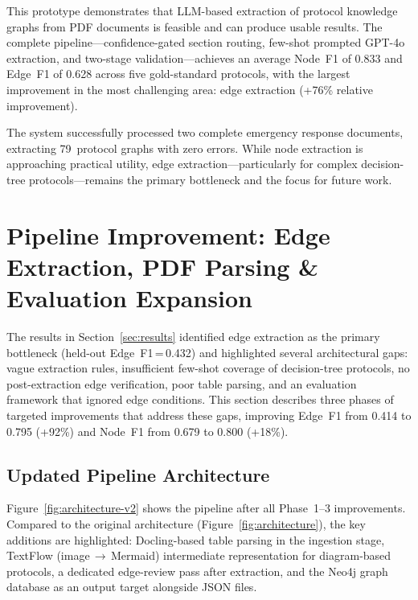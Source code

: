 \documentclass[12pt,a4paper]{article}
\begin{document}
This prototype demonstrates that LLM-based extraction of protocol knowledge graphs from PDF documents is feasible and can produce usable results. The complete pipeline---confidence-gated section routing, few-shot prompted GPT-4o extraction, and two-stage validation---achieves an average Node~F1 of 0.833 and Edge~F1 of 0.628 across five gold-standard protocols, with the largest improvement in the most challenging area: edge extraction (+76\% relative improvement).

The system successfully processed two complete emergency response documents, extracting 79~protocol graphs with zero errors. While node extraction is approaching practical utility, edge extraction---particularly for complex decision-tree protocols---remains the primary bottleneck and the focus for future work.


\section{Pipeline Improvement: Edge Extraction, PDF Parsing \& Evaluation Expansion}
\label{sec:phase1-3}

The results in Section~\ref{sec:results} identified edge extraction as the primary bottleneck (held-out Edge~F1\,=\,0.432) and highlighted several architectural gaps: vague extraction rules, insufficient few-shot coverage of decision-tree protocols, no post-extraction edge verification, poor table parsing, and an evaluation framework that ignored edge conditions. This section describes three phases of targeted improvements that address these gaps, improving Edge~F1 from 0.414 to 0.795 (+92\%) and Node~F1 from 0.679 to 0.800 (+18\%).

\subsection{Updated Pipeline Architecture}
\label{sec:updated-architecture}

Figure~\ref{fig:architecture-v2} shows the pipeline after all Phase~1--3 improvements. Compared to the original architecture (Figure~\ref{fig:architecture}), the key additions are highlighted: Docling-based table parsing in the ingestion stage, TextFlow (image\,$\rightarrow$\,Mermaid) intermediate representation for diagram-based protocols, a dedicated edge-review pass after extraction, and the Neo4j graph database as an output target alongside JSON files.
\end{document}
